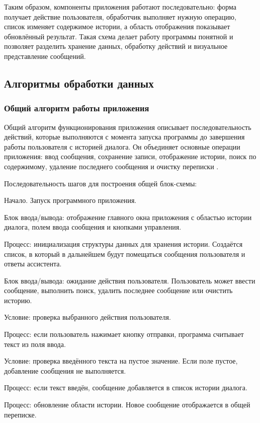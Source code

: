 \documentclass[12pt,a4paper]{article}
\begin{document}
Таким образом, компоненты приложения работают последовательно: форма получает действие пользователя, обработчик выполняет нужную операцию, список изменяет содержимое истории, а область отображения показывает обновлённый результат. Такая схема делает работу программы понятной и позволяет разделить хранение данных, обработку действий и визуальное представление сообщений.

\subsection{Алгоритмы обработки данных}

\subsubsection{Общий алгоритм работы приложения}

Общий алгоритм функционирования приложения описывает последовательность действий, которые выполняются с момента запуска программы до завершения работы пользователя с историей диалога. Он объединяет основные операции приложения: ввод сообщения, сохранение записи, отображение истории, поиск по содержимому, удаление последнего сообщения и очистку переписки \cite{ref15}.

Последовательность шагов для построения общей блок-схемы:

Начало. Запуск программного приложения.

Блок ввода/вывода: отображение главного окна приложения с областью истории диалога, полем ввода сообщения и кнопками управления.

Процесс: инициализация структуры данных для хранения истории. Создаётся список, в который в дальнейшем будут помещаться сообщения пользователя и ответы ассистента.

Блок ввода/вывода: ожидание действия пользователя. Пользователь может ввести сообщение, выполнить поиск, удалить последнее сообщение или очистить историю.

Условие: проверка выбранного действия пользователя.

Процесс: если пользователь нажимает кнопку отправки, программа считывает текст из поля ввода.

Условие: проверка введённого текста на пустое значение. Если поле пустое, добавление сообщения не выполняется.

Процесс: если текст введён, сообщение добавляется в список истории диалога.

Процесс: обновление области истории. Новое сообщение отображается в общей переписке.
\end{document}

